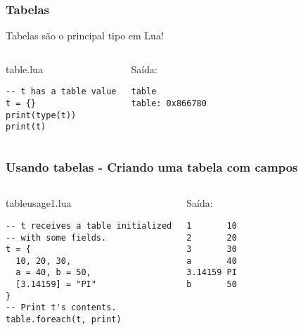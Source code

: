 \documentclass[brazil]{beamer}
\begin{document}
\begin{frame}[fragile]
  \frametitle{Tabelas}
  \pause
  \begin{center}
    Tabelas são o principal tipo em Lua!
  \end{center}
  \pause
  \begin{columns}
      \begin{block}{table.lua}
        \begin{lstlisting}
-- t has a table value
t = {}
print(type(t))
print(t)
        \end{lstlisting}
      \end{block}
    \pause
      \begin{block}{Saída:}
        \begin{verbatim}
table
table: 0x866780  \end{verbatim}
      \end{block}
  \end{columns}
\end{frame}


\begin{frame}[fragile]
  \frametitle{Usando tabelas - Criando uma tabela com campos}
  \pause
  \begin{columns}
      \begin{block}{tableusage1.lua}
        \begin{lstlisting}
-- t receives a table initialized
-- with some fields.
t = {
  10, 20, 30,
  a = 40, b = 50,
  [3.14159] = "PI"
}
-- Print t's contents.
table.foreach(t, print)
        \end{lstlisting}
      \end{block}
    \pause
      \begin{block}{Saída:}
        \begin{verbatim}
1       10
2       20
3       30
a       40
3.14159 PI
b       50  \end{verbatim}
      \end{block}
  \end{columns}
\end{frame}

\end{document}
